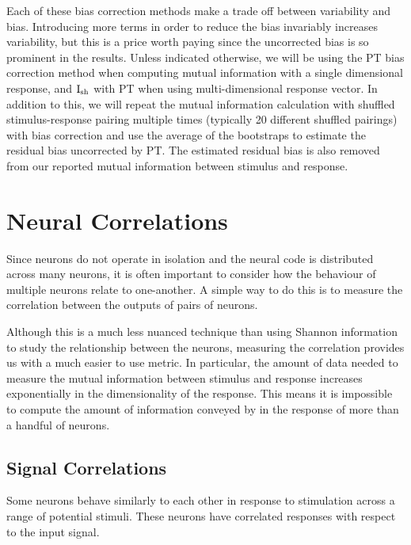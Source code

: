 Each of these bias correction methods make a trade off between variability and bias.
Introducing more terms in order to reduce the bias invariably increases variability, but this is a price worth paying since the uncorrected bias is so prominent in the results.
Unless indicated otherwise, we will be using the \ac{PT} bias correction method when computing mutual information with a single dimensional response, and $\operatorname{I}_{\text{sh}}$ with \ac{PT} when using multi-dimensional response vector.
In addition to this, we will repeat the mutual information calculation with shuffled stimulus-response pairing multiple times (typically 20 different shuffled pairings) with bias correction and use the average of the bootstraps to estimate the residual bias uncorrected by \ac{PT}.
The estimated residual bias is also removed from our reported mutual information between stimulus and response.


\section{Neural Correlations}
\label{sec:bg-corr}

Since neurons do not operate in isolation and the neural code is distributed across many neurons, it is often important to consider how the behaviour of multiple neurons relate to one-another.
A simple way to do this is to measure the correlation between the outputs of pairs of neurons.

Although this is a much less nuanced technique than using Shannon information to study the relationship between the neurons, measuring the correlation provides us with a much easier to use metric.
In particular, the amount of data needed to measure the mutual information between stimulus and response increases exponentially in the dimensionality of the response.
This means it is impossible to compute the amount of information conveyed by in the response of more than a handful of neurons.


\subsection{Signal Correlations}
\label{sec:bg-sigcorr}

Some neurons behave similarly to each other in response to stimulation across a range of potential stimuli.
These neurons have correlated responses with respect to the input signal.

